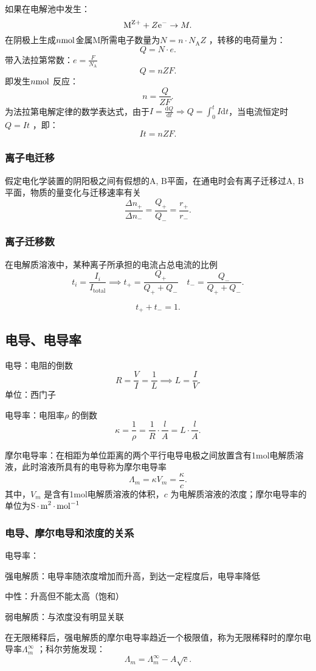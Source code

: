 如果在电解池中发生： \[
    \ce{M^{Z+}} + Z\ce{e-} \to M
.\]
在阴极上生成$n\ce{mol}$金属M所需电子数量为$N =n\cdot N_\text{A}Z$ ，转移的电荷量为： \[
    Q = N\cdot e
.\]
带入法拉第常数：$e = \frac{F}{N_\text{A}}$ \[
    Q = nZF
.\]
即发生$n\ce{mol}$ 反应：
\[
    n = \frac{Q}{ZF}
.\]
为法拉第电解定律的数学表达式，由于$I = \frac{\mathrm{d}Q}{\mathrm{d}t}\Rightarrow Q = \int_{0}^{t} I \mathrm{d}t$，当电流恒定时$Q = It$ ，即：\[
    It = nZF
.\]
\subsubsection{离子电迁移}%
\label{ssub:离子电迁移}
假定电化学装置的阴阳极之间有假想的A, B平面，在通电时会有离子迁移过A, B平面，物质的量变化与迁移速率有关
\[
    \frac{\Delta n_{+}}{\Delta n_{-}} = \frac{Q_+}{Q_-} = \frac{r_{+}}{r_{-}}
.\]
\subsubsection{离子迁移数}%
\label{ssub:离子迁移数}
\begin{defi}
在电解质溶液中，某种离子所承担的电流占总电流的比例
\[
    t_i = \frac{I_i}{I_\text{total}} \implies t_+ = \frac{Q_+}{Q_++Q_-}\quad t_- = \frac{Q_-}{Q_++Q_-}
.\]
\end{defi}
\[
    t_++t_- = 1
.\]
\subsection{电导、电导率}%
\label{sub:电导、电导率}
\begin{defi}
    电导：电阻的倒数\[
        R = \frac{V}{I} = \frac{1}{L} \implies L = \frac{I}{V}
    .\]
    单位：西门子
\end{defi}
\begin{defi}
    电导率：电阻率$\rho$ 的倒数\[
        \kappa = \frac{1}{\rho} = \frac{1}{R}\cdot \frac{l}{A} = L\cdot \frac{l}{A}
    .\]
\end{defi}
\begin{defi}
    摩尔电导率：在相距为单位距离的两个平行电导电极之间放置含有1mol电解质溶液，此时溶液所具有的电导称为摩尔电导率\[
        \Lambda_{m} = \kappa V_{m} = \frac{\kappa}{c}
    .\]
    其中，$V_{m}$ 是含有1mol电解质溶液的体积，$c$ 为电解质溶液的浓度；摩尔电导率的单位为$\ce{S*m^2*mol^{-1}}$
\end{defi}
\subsubsection{电导、摩尔电导和浓度的关系}%
\label{ssub*:电导、摩尔电导和浓度的关系}
\begin{notation}
    电导率：

强电解质：电导率随浓度增加而升高，到达一定程度后，电导率降低

中性：升高但不能太高（饱和）

弱电解质：与浓度没有明显关联
\end{notation}
\begin{notation}
    在无限稀释后，强电解质的摩尔电导率趋近一个极限值，称为无限稀释时的摩尔电导率$\Lambda_{m}^{\infty }$ ；科尔劳施发现：\[
        \Lambda_{m} = \Lambda_{m}^{\infty } -A\sqrt{c}
    .\]
\end{notation}
